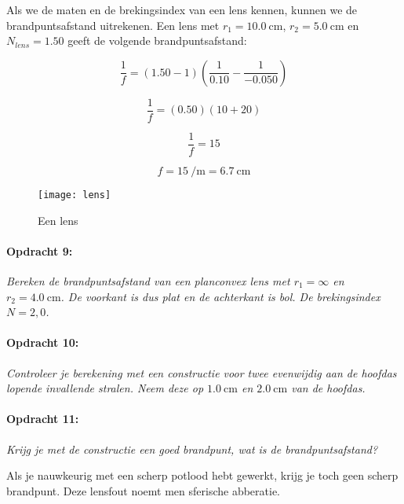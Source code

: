 Als we de maten en de brekingsindex van een lens kennen, kunnen we
de brandpuntsafstand uitrekenen. Een lens met $r_{1}=\SI{10.0}{\centi\meter}$,
$r_{2}=\SI{5.0}{\centi\meter}$ en $N_{lens}=1.50$ geeft de volgende brandpuntsafstand:

\[
\frac{1}{f}=(1.50-1)(\frac{1}{0.10}-\frac{1}{-0.050})
\]


\[
\frac{1}{f}=(0.50)(10+20)
\]


\[
\frac{1}{f}=15
\]


\[
f=\SI{15}{\per\meter}=\SI{6.7}{\centi\meter}
\]


\begin{figure}[H]
\noindent \begin{centering}
\texttt{[image: lens]}
\par\end{centering}

\caption{Een lens}
\end{figure}


\paragraph*{Opdracht 9:}

\emph{Bereken de brandpuntsafstand van een planconvex lens met $r_{1}=\infty$
en $r_{2}=\SI{4.0}{\centi\meter}$. De voorkant is dus plat en de achterkant
is bol. De brekingsindex $N=2,0$.}


\paragraph*{Opdracht 10:}

\emph{Controleer je berekening met een constructie voor twee evenwijdig
aan de hoofdas lopende invallende stralen. Neem deze op $\SI{1.0}{\centi\meter}$
en $\SI{2.0}{\centi\meter}$ van de hoofdas.}


\paragraph*{Opdracht 11:}

\emph{Krijg je met de constructie een goed brandpunt, wat is de brandpuntsafstand?}

Als je nauwkeurig met een scherp potlood hebt gewerkt, krijg je toch
geen scherp brandpunt. Deze lensfout noemt men sferische abberatie.


